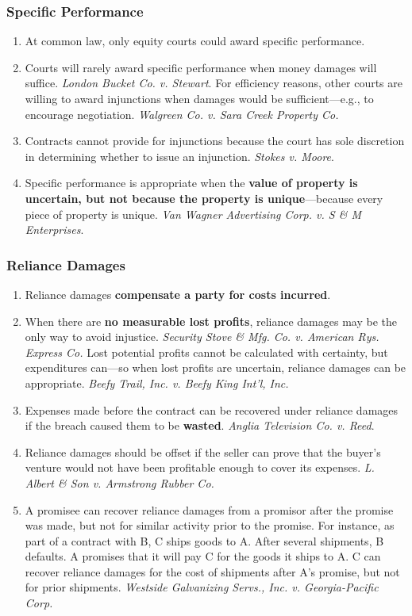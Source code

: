 \subsubsection{Specific Performance}

\begin{enumerate}
    \item At common law, only equity courts could award specific performance.
    \item Courts will rarely award specific performance when money damages 
    will suffice. \emph{London Bucket Co. v. Stewart}. For efficiency reasons, 
    other courts are willing to award injunctions when damages would be 
    sufficient---e.g., to encourage negotiation. \emph{Walgreen Co. v. Sara 
    Creek Property Co.}
    \item Contracts cannot provide for injunctions because the court has sole 
    discretion in determining whether to issue an injunction. \emph{Stokes v. 
    Moore}.
    \item Specific performance is appropriate when the \textbf{value of 
    property is uncertain, but not because the property is unique}---because 
    every piece of property is unique.  \emph{Van Wagner Advertising Corp. v. 
    S \& M Enterprises}.
\end{enumerate}

\subsubsection{Reliance Damages}

\begin{enumerate}
    \item Reliance damages \textbf{compensate a party for costs incurred}.
    \item When there are \textbf{no measurable lost profits}, reliance damages 
    may be the only way to avoid injustice. \emph{Security Stove \& Mfg. Co.  
    v.  American Rys. Express Co.} Lost potential profits cannot be calculated 
    with certainty, but expenditures can---so when lost profits are uncertain, 
    reliance damages can be appropriate. \emph{Beefy Trail, Inc. v. Beefy King 
    Int'l, Inc.}
    \item Expenses made before the contract can be recovered under reliance 
    damages if the breach caused them to be \textbf{wasted}. \emph{Anglia 
    Television Co. v. Reed}.
    \item Reliance damages should be offset if the seller can prove that 
    the buyer's venture would not have been profitable enough to cover its 
    expenses. \emph{L. Albert \& Son v. Armstrong Rubber Co.}
    \item A promisee can recover reliance damages from a promisor after the 
    promise was made, but not for similar activity prior to the promise. For 
    instance, as part of a contract with B, C ships goods to A. After several 
    shipments, B defaults. A promises that it will pay C for the goods it 
    ships to A. C can recover reliance damages for the cost of shipments after 
    A's promise, but not for prior shipments. \emph{Westside Galvanizing 
    Servs., Inc. v. Georgia-Pacific Corp.}
\end{enumerate}


